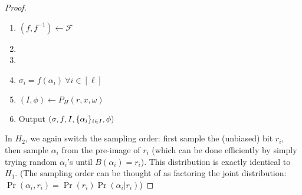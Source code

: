 \begin{proof}
\begin{enumerate}
    \item $(f, f^{-1}) \gets \mathcal{F}$
    \item {}
    \item {}
    \item $\sigma_i = f(\alpha_i) ~\forall i \in [\ell]$
    \item $(I, \phi) \gets P_H(r, x, \omega)$
    \item Output $(\sigma, f, I, \{\alpha_i\}_{i \in I}, \phi)$
\end{enumerate}
In $H_2$, we again switch the sampling order: first sample the (unbiased) bit
$r_i$, then sample $\alpha_i$ from the pre-image of $r_i$ (which can be done efficiently
by simply trying random $\alpha_i$'s until $B(\alpha_i) = r_i$).
This distribution is exactly identical to $H_1$.
(The sampling order can be thought of as factoring the joint distribution:
$\Pr(\alpha_i, r_i) = \Pr(r_i)\Pr(\alpha_i | r_i)$)


\end{proof}
